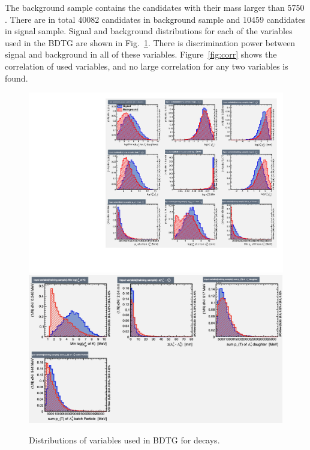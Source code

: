 The background sample contains the candidates with their \Lb mass larger than 5750 \mevcc. %
There are in total 40082 candidates in background sample and 10459 candidates in signal sample. 
Signal and background distributions for each of the variables used in the BDTG are shown in Fig.~\ref{fig:BDTGvariables}. 
There is discrimination power between signal and background in all of these variables. 
Figure~\ref{fig:corr} shows the correlation of used variables, 
and no large correlation for any two variables is found. 


\begin{figure}[!btp]
\centering
\includegraphics[scale=0.8]{Figures/05_open_charm/02_selection/variables_id_c1.pdf}\\%
\vskip -0.04cm
\includegraphics[scale=0.35]{Figures/05_open_charm/02_selection/variables_id_c2.png}%
\vskip -0.0cm
\caption{Distributions of variables used in BDTG for \LbLckkpi decays.}
\label{fig:BDTGvariables}
\end{figure}

